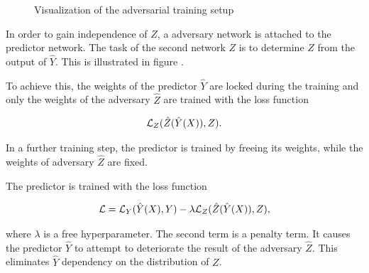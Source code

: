\documentclass[12pt, a4paper]{thesis}
\begin{document}
\begin{figure}[H]
  \caption{Visualization of the adversarial training setup}
  \label{adv-training}
\end{figure}

In order to gain independence of \(Z\), a adversary network is attached to
the predictor network. The task of the second network \( Z\) is to
determine \(Z\) from the output of \(\hat Y\). This is illustrated in
figure \label{adv-training}.

To achieve this, the weights of the predictor \(\hat Y\) are locked
during the training and only the weights of the adversary \(\hat Z\)
are trained with the loss function

\begin{align}
  {\cal L}_Z(\hat Z(\hat Y(X)), Z).
\end{align}

In a further training step, the predictor is trained by freeing its
weights, while the weights of adversary \(\hat Z\) are fixed.

The predictor is trained with the loss function

\begin{align}
  {\cal L} = {\cal L}_Y(\hat Y(X), Y) - \lambda {\cal L}_Z(\hat Z(\hat Y(X)), Z),
\end{align}

where \(\lambda\) is a free hyperparameter.  The second term is a
penalty term. It causes the predictor \(\hat Y\) to attempt to
deteriorate the result of the adversary \(\hat Z\). This eliminates
\(\hat Y\) dependency on the distribution of \(Z\).
\end{document}
